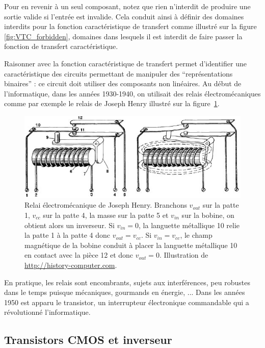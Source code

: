 Pour en revenir à un seul composant, notez que rien n'interdit de produire une sortie valide si l'entrée est invalide. Cela conduit ainsi à définir des domaines interdits pour la fonction caractéristique de transfert comme illustré sur la figure \ref{fig:VTC_forbidden}, domaines dans lesquels il est interdit de faire passer la fonction de transfert caractéristique.

Raisonner avec la fonction caractéristique de transfert permet d'identifier une caractéristique des circuits permettant de manipuler des ``représentations binaires'' : ce circuit doit utiliser des composants non linéaires. Au début de l'informatique, dans les années 1930-1940, on utilisait des relais électromécaniques comme par exemple le relais de Joseph Henry illustré sur la figure~\ref{fig:relay}.

\begin{figure}[htbp]
\centering\includegraphics[width=0.5\linewidth]{eps/relay.jpg}
\caption{\label{fig:relay} Relai électromécanique de Joseph Henry. Branchons $v_{out}$ sur la patte 1, $v_{cc}$ sur la patte 4, la masse sur la patte 5 et $v_{in}$ sur la bobine, on obtient alors un inverseur. Si $v_{in}=0$, la languette métallique 10 relie la patte 1 à la patte 4 donc $v_{out}=v_{cc}$. Si $v_{in} = v_{cc}$, le champ magnétique de la bobine conduit à placer la languette métallique 10 en contact avec la pièce 12 et donc $v_{out}=0$. Illustration de \url{http://history-computer.com}.}
\end{figure}

En pratique, les relais sont encombrants, sujets aux interférences, peu robustes dans le temps puisque mécaniques, gourmands en énergie, ... Dans les années 1950 est apparu le transistor, un interrupteur électronique commandable qui a révolutionné l'informatique.

\subsection{Transistors CMOS et inverseur}

